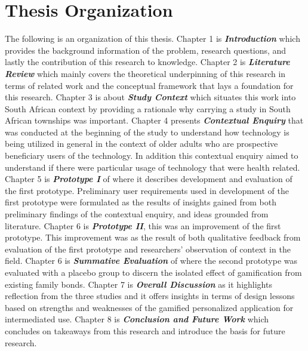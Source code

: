 \section{Thesis Organization}
The following is an organization of this thesis. Chapter 1 is \emph{\textbf{Introduction}} which provides the background information of the problem, research questions, and lastly the contribution of this research to knowledge. Chapter 2 is \emph{\textbf{Literature Review}} which mainly covers  the theoretical underpinning of this research in terms of related work and the conceptual framework that lays a foundation for this research. Chapter 3 is about \emph{\textbf{Study Context}} which situates this work into South African context by providing a rationale why carrying  a study in South African townships was important. Chapter 4 presents \emph{\textbf{Contextual Enquiry}} that was conducted at the beginning of the study to understand how technology is being utilized in general in the context of older adults who are prospective beneficiary users of the technology. In addition this contextual enquiry aimed to understand if there were particular usage of technology that were health related. Chapter 5 is \emph{\textbf{Prototype I}} of where it describes development and evaluation of the first prototype. Preliminary user requirements used in development of the first prototype were formulated as the results of insights gained from both preliminary findings of the contextual enquiry, and ideas grounded from literature. Chapter 6 is \emph{\textbf{Prototype II}}, this was an improvement of the first prototype. This improvement was as the result of both qualitative feedback from evaluation of the first prototype and researchers' observation of context in the field. Chapter 6 is \emph{\textbf{Summative Evaluation}} of where the second prototype was evaluated with a placebo group to discern the isolated effect of gamification from existing family bonds. Chapter 7 is \emph{\textbf{Overall Discussion}} as it highlights reflection from the three studies and it offers insights in terms of design lessons based on strengths and weaknesses of the gamified personalized application for intermediated use. Chapter 8 is \emph{\textbf{Conclusion and Future Work}} which concludes on takeaways from this research and introduce the basis for future research.         
\begin{flushright}
\end{flushright}
